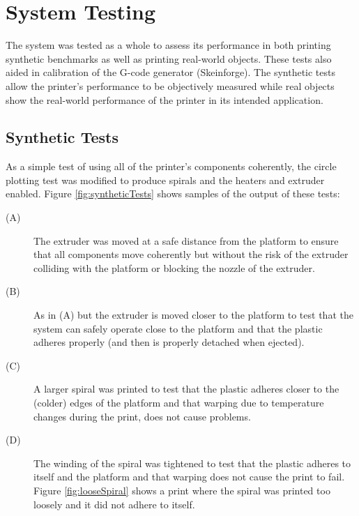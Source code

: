 	\section{System Testing}
		
		The system was tested as a whole to assess its performance in both printing
		synthetic benchmarks as well as printing real-world objects. These tests
		also aided in calibration of the G-code generator (Skeinforge). The
		synthetic tests allow the printer's performance to be objectively measured
		while real objects show the real-world performance of the printer in its
		intended application.
		
		\subsection{Synthetic Tests}
			
			As a simple test of using all of the printer's components coherently, the
			circle plotting test was modified to produce spirals and the heaters and
			extruder enabled. Figure \ref{fig:syntheticTests} shows samples of the
			output of these tests:
			\begin{description}
				
				\item[(A)] The extruder was moved at a safe distance from the platform
				to ensure that all components move coherently but without the risk of
				the extruder colliding with the platform or blocking the nozzle of the
				extruder.
				
				\item[(B)] As in (A) but the extruder is moved closer to the platform to
				test that the system can safely operate close to the platform and that
				the plastic adheres properly (and then is properly detached when
				ejected).
				
				\item[(C)] A larger spiral was printed to test that the plastic adheres
				closer to the (colder) edges of the platform and that warping due to
				temperature changes during the print, does not cause problems.
				
				\item[(D)] The winding of the spiral was tightened to test that the
				plastic adheres to itself and the platform and that warping does not
				cause the print to fail. Figure \ref{fig:looseSpiral} shows a print
				where the spiral was printed too loosely and it did not adhere to
				itself.
				
			\end{description}
			
